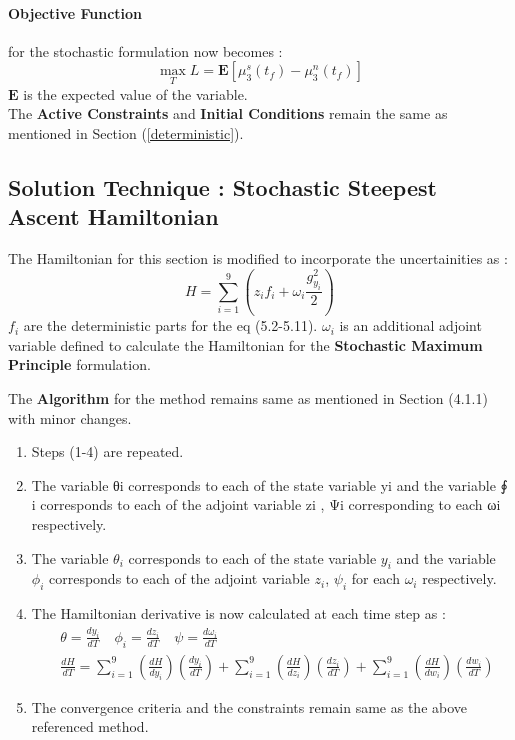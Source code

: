 \paragraph{Objective Function} for the stochastic formulation now becomes :
\begin{equation} \label{objective}
\max_{T} L = \mathbf{E}\left[ \mu_{3}^{s}(t_{f}) - \mu_{3}^{n}(t_{f})\right]
\end{equation}
$\mathbf{E}$ is the expected value of the variable. \\
The \textbf{Active Constraints} and \textbf{Initial Conditions} remain the same as mentioned in Section (\ref{deterministic}).

\subsection{Solution Technique : Stochastic Steepest Ascent Hamiltonian}

The Hamiltonian for this section is modified to incorporate the uncertainities as\cite{yenkie} :
\begin{equation}
H = \sum_{i=1}^{9} \left( z_{i}f_{i} + \omega_{i}\frac{g_{y_{i}}^2}{2} \right)
\end{equation}
$f_{i}$ are the deterministic parts for the eq (5.2-5.11). $\omega_{i}$ is an additional adjoint variable defined to calculate the Hamiltonian for the \textbf{Stochastic Maximum Principle} formulation\cite{ramirez}.  

The \textbf{Algorithm} for the method remains same as mentioned in Section (4.1.1) with minor changes.
\begin{enumerate}
\item  Steps (1-4) are repeated. 
\item The variable θi corresponds to each of the state variable yi and the variable ∮ i corresponds to each of the adjoint variable zi , Ψi corresponding to each ωi respectively.
\item The variable $\theta_{i}$ corresponds to each of the state variable $y_{i}$ and the variable $\phi_{i}$ corresponds to each of the adjoint variable $z_{i}$, $\psi_{i}$ for each $\omega_{i}$ respectively.

\item The Hamiltonian derivative is now calculated at each time step  as :
\begin{align}
&\theta = \frac{dy_{i}}{dT} \quad \phi_{i} = \frac{dz_{i}}{dT} \quad \psi = \frac{d\omega_{i}}{dT} \\
&\frac{dH}{dT} = \sum_{i=1}^{9} \left( \frac{dH}{dy_{i}}\right)\left(	\frac{dy_{i}}{dT} \right) + \sum_{i=1}^{9} \left(\frac{dH}{dz_{i}}\right)\left(\frac{dz_{i}}{dT} \right) + \sum_{i=1}^{9} \left(\frac{dH}{dw_{i}}\right)\left(\frac{dw_{i}}{dT} \right)
\end{align}
\item The convergence criteria and the constraints remain same as the above referenced method.
\end{enumerate} 


